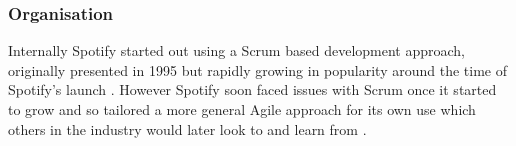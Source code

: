 \subsubsection{Organisation}
Internally Spotify started out using a Scrum based development approach, originally presented in 1995 \parencite[][118]{scrum_paper, spotify_eng_culture_1} but rapidly growing in popularity around the time of Spotify's launch \parencite{scrumalliance_membership_2014}. However Spotify soon faced issues with Scrum once it started to grow and so tailored a more general Agile approach for its own use which others in the industry would later look to and learn from \parencite{spotify_eng_culture_1, spotify_eng_culture_2, spotify_agile_article, emulating_spotifys_matrix, scaling_agile_spotify_scrum, how_spotify_scales}.
